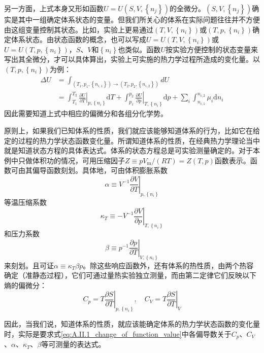 \documentclass[main.tex]{subfiles}
\begin{document}
另一方面，上式本身又形如函数$U=U\left(S,V,\left\{n_j\right\}\right)$的全微分。$\left(S,V,\left\{n_j\right\}\right)$确实是其中一组确定体系状态的变量。但我们所关心的体系在实际问题往往并不方便由这组变量控制其状态。比如，实验上更易通过$\left(T,V,\left\{n_i\right\}\right)$或$\left(T,p,\left\{n_i\right\}\right)$确定体系状态。由状态函数的概念，也可以写成$U=U\left(T,V,\left\{n_i\right\}\right)$或$U=U\left(T,p,\left\{n_i\right\}\right)$，$S$、$V$和$\left\{n_i\right\}$也类似。函数$U$按实验方便控制的状态变量来写出其全微分，才可以具体算出，实验上可实施的热力学过程所造成的变化量。以$\left(T,p,\left\{n_i\right\}\right)$为例：
\begin{equation}\label{eq:A.II.1_change_of_function_value}
    \begin{aligned}
        \Delta U & =\int_{\left(T_1,p_1,\left\{n_{i,1}\right\}\right)\rightarrow\left(T_2,p_2,\left\{n_{i,2}\right\}\right)} dU                                                                                                                                \\
                 & =\int_{T_1}^{T_2}\left.\frac{\partial U}{\partial T}\right|_{p,\left\{n_i\right\}}\mathrm{d}T+\int_{p_1}^{p_2}\left.\frac{\partial U}{\partial p}\right|_{T,\left\{n_i\right\}}\mathrm{d}p+\sum_i\int_{n_{i,1}}^{n_{i,2}}\mu_i\mathrm{d}n_i
    \end{aligned}
\end{equation}
因此需要知道上式中相应的偏微分和各组分化学势。

原则上，如果我们已知体系的性质，我们就应该能够知道体系的行为，比如它在给定的过程的热力学状态函数变化量。所谓知道体系的性质，在经典热力学理论当中就是知道状态方程的具体表达式。体系的状态方程总是可实验测量确定的。对于本例中只做体积功的情况，可用压缩因子$Z\equiv pV_\text{m}/\left(RT\right)=Z\left(T,p\right)$函数表示。函数可由其偏导函数刻划。具体地，可由体积膨胀系数
\[\alpha\equiv V^{-1}\left.\frac{\partial V}{\partial T}\right|_{p,\left\{n_i\right\}} \]
等温压缩系数
\[\kappa_T\equiv-V^{-1}\left.\frac{\partial V}{\partial p}\right|_{T,\left\{n_i\right\}}\]
和压力系数
\[\beta\equiv p^{-1}\left.\frac{\partial p}{\partial T}\right|_{V,\left\{n_i\right\}}\]
来刻划。且可证$\alpha\equiv\kappa_T\beta p$。除这些响应函数外，还有体系的热性质，由两个热容确定（准静态过程），它们可通过量热实验独立测量，而由第二定律它们反映以下熵的偏微分：
\[C_p=T\left.\frac{\partial S}{\partial T}\right|_{p,\left\{n_i\right\}},\quad C_V=T\left.\frac{\partial S}{\partial T}\right|_{V}\]

因此，当我们说，知道体系的性质，就应该能确定体系的热力学状态函数的变化量时，实际是要求式\eqref{eq:A.II.1_change_of_function_value}中各偏导数关于$C_p$、$C_V$、$\alpha$、$\kappa_T$、$\beta$等可测量的表达式。
\end{document}
